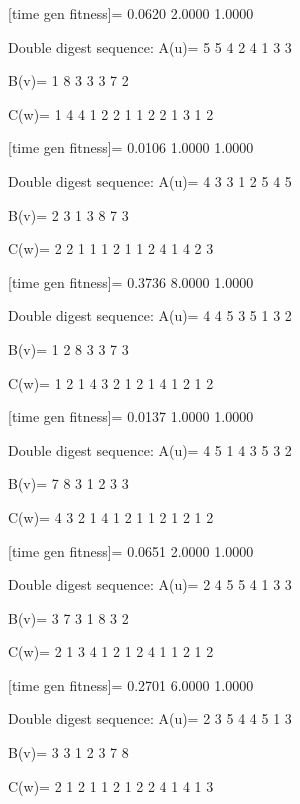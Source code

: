[time gen fitness]=
    0.0620    2.0000    1.0000

Double digest sequence:
A(u)=
     5     5     4     2     4     1     3     3

B(v)=
     1     8     3     3     3     7     2

C(w)=
     1     4     4     1     2     2     1     1     2     2     1     3     1     2

[time gen fitness]=
    0.0106    1.0000    1.0000

Double digest sequence:
A(u)=
     4     3     3     1     2     5     4     5

B(v)=
     2     3     1     3     8     7     3

C(w)=
     2     2     1     1     1     2     1     1     2     4     1     4     2     3

[time gen fitness]=
    0.3736    8.0000    1.0000

Double digest sequence:
A(u)=
     4     4     5     3     5     1     3     2

B(v)=
     1     2     8     3     3     7     3

C(w)=
     1     2     1     4     3     2     1     2     1     4     1     2     1     2

[time gen fitness]=
    0.0137    1.0000    1.0000

Double digest sequence:
A(u)=
     4     5     1     4     3     5     3     2

B(v)=
     7     8     3     1     2     3     3

C(w)=
     4     3     2     1     4     1     2     1     1     2     1     2     1     2

[time gen fitness]=
    0.0651    2.0000    1.0000

Double digest sequence:
A(u)=
     2     4     5     5     4     1     3     3

B(v)=
     3     7     3     1     8     3     2

C(w)=
     2     1     3     4     1     2     1     2     4     1     1     2     1     2

[time gen fitness]=
    0.2701    6.0000    1.0000

Double digest sequence:
A(u)=
     2     3     5     4     4     5     1     3

B(v)=
     3     3     1     2     3     7     8

C(w)=
     2     1     2     1     1     2     1     2     2     4     1     4     1     3

